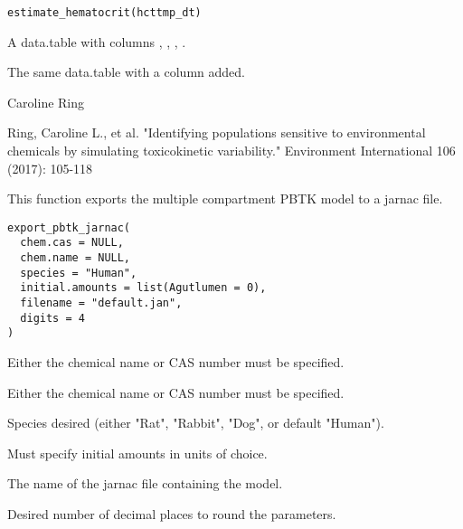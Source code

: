 \documentclass[a4paper]{book}
\begin{document}
%
\begin{Usage}
\begin{verbatim}
estimate_hematocrit(hcttmp_dt)
\end{verbatim}
\end{Usage}
%
\begin{Arguments}
\begin{ldescription}
\item[\code{hcttmp\_dt}] A data.table with columns ,
, , .
\end{ldescription}
\end{Arguments}
%
\begin{Value}
The same data.table with a  column added.
\end{Value}
%
\begin{Author}\relax
Caroline Ring
\end{Author}
%
\begin{References}\relax
Ring, Caroline L., et al. "Identifying populations sensitive to 
environmental chemicals by simulating toxicokinetic variability." Environment 
International 106 (2017): 105-118
\end{References}
%
\begin{Description}\relax
This function exports the multiple compartment PBTK model to a jarnac file.
\end{Description}
%
\begin{Usage}
\begin{verbatim}
export_pbtk_jarnac(
  chem.cas = NULL,
  chem.name = NULL,
  species = "Human",
  initial.amounts = list(Agutlumen = 0),
  filename = "default.jan",
  digits = 4
)
\end{verbatim}
\end{Usage}
%
\begin{Arguments}
\begin{ldescription}
\item[\code{chem.cas}] Either the chemical name or CAS number must be specified.

\item[\code{chem.name}] Either the chemical name or CAS number must be specified.

\item[\code{species}] Species desired (either "Rat", "Rabbit", "Dog", or default
"Human").

\item[\code{initial.amounts}] Must specify initial amounts in units of choice.

\item[\code{filename}] The name of the jarnac file containing the model.

\item[\code{digits}] Desired number of decimal places to round the parameters.
\end{ldescription}
\end{Arguments}
\end{document}
